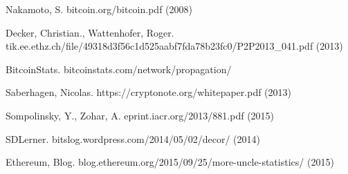 \documentclass{article}
\begin{document}
\begin{thebibliography}{999}

  Nakamoto, S.
  \newblock bitcoin.org/bitcoin.pdf (2008)

  Decker, Christian., Wattenhofer, Roger.
  \newblock tik.ee.ethz.ch/file/49318d3f56c1d525aabf7fda78b23fc0/P2P2013\_041.pdf (2013)

  BitcoinStats.
  \newblock bitcoinstats.com/network/propagation/

  Saberhagen, Nicolas.
  \newblock https://cryptonote.org/whitepaper.pdf (2013)

  Sompolinsky, Y., Zohar, A.
  \newblock eprint.iacr.org/2013/881.pdf (2015)

  SDLerner.
  \newblock bitslog.wordpress.com/2014/05/02/decor/ (2014)

  Ethereum, Blog.
  \newblock blog.ethereum.org/2015/09/25/more-uncle-statistics/ (2015)

\end{thebibliography}
\end{document}

